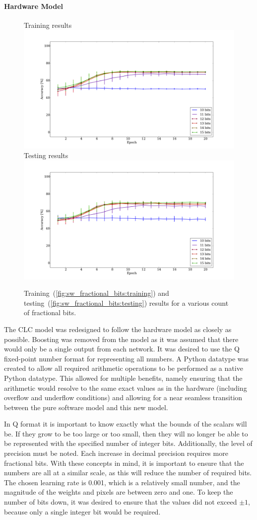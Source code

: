 \documentclass[10pt,journal]{IEEEtran}
\newcommand{\subfig}[1]{~(\ref{#1})}
\begin{document}
			\paragraph{Hardware Model}
				\begin{figure}[t!]
					\captionsetup[subfigure]{position=b}
					\centering
					\hfill
					\subcaptionbox
					{
						Training results
						\label{fig:sw_fractional_bits:training}
					}
					{\includegraphics[width=0.49\linewidth]{sw_fractional_bits_training}}
					\hfill
					\subcaptionbox
					{
						Testing results
						\label{fig:sw_fractional_bits:testing}
					}
					{\includegraphics[width=0.49\linewidth]{sw_fractional_bits_testing}}
					\hfill
					\caption{Training\subfig{fig:sw_fractional_bits:training} and testing\subfig{fig:sw_fractional_bits:testing} results for a various count of fractional bits.}
					\label{fig:fractional_bits}
				\end{figure}
				
				The CLC model was redesigned to follow the hardware model as closely as possible. Boosting was removed from the model as it was assumed that there would only be a single output from each network. It was desired to use the Q fixed-point number format for representing all numbers. A Python datatype was created to allow all required arithmetic operations to be performed as a native Python datatype. This allowed for multiple benefits, namely ensuring that the arithmetic would resolve to the same exact values as in the hardware (including overflow and underflow conditions) and allowing for a near seamless transition between the pure software model and this new model.
				
				In Q format it is important to know exactly what the bounds of the scalars will be. If they grow to be too large or too small, then they will no longer be able to be represented with the specified number of integer bits. Additionally, the level of precision must be noted. Each increase in decimal precision requires more fractional bits. With these concepts in mind, it is important to ensure that the numbers are all at a similar scale, as this will reduce the number of required bits. The chosen learning rate is 0.001, which is a relatively small number, and the magnitude of the weights and pixels are between zero and one. To keep the number of bits down, it was desired to ensure that the values did not exceed \(\pm{1}\), because only a single integer bit would be required.
				
\end{document}
